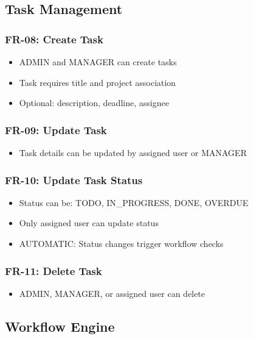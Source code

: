 \documentclass[12pt,a4paper,twoside]{book}
\begin{document}
\subsection{Task Management}

\subsubsection{FR-08: Create Task}
\begin{itemize}
    \item ADMIN and MANAGER can create tasks
    \item Task requires title and project association
    \item Optional: description, deadline, assignee
\end{itemize}

\subsubsection{FR-09: Update Task}
\begin{itemize}
    \item Task details can be updated by assigned user or MANAGER
\end{itemize}

\subsubsection{FR-10: Update Task Status}
\begin{itemize}
    \item Status can be: TODO, IN\_PROGRESS, DONE, OVERDUE
    \item Only assigned user can update status
    \item AUTOMATIC: Status changes trigger workflow checks
\end{itemize}

\subsubsection{FR-11: Delete Task}
\begin{itemize}
    \item ADMIN, MANAGER, or assigned user can delete
\end{itemize}

\subsection{Workflow Engine}
\end{document}
